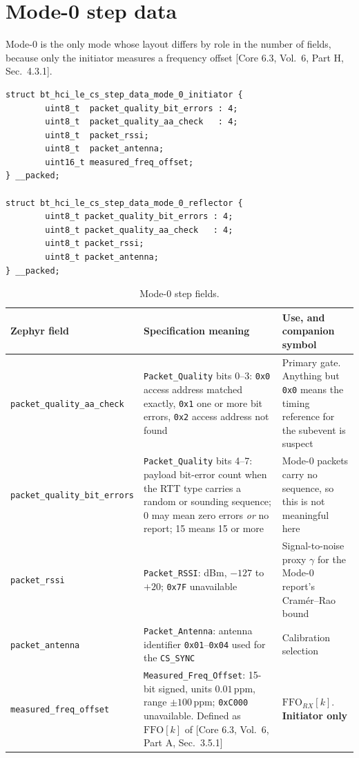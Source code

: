\documentclass[11pt,a4paper]{article}
\newcommand{\code}[1]{\texttt{\small #1}}
\newcommand{\FFO}{\ensuremath{\mathrm{FFO}}}
\newcommand{\core}[1]{\textcolor{rulegrey}{\small[Core 6.3, #1]}}
\begin{document}
\section{Mode-0 step data}
\label{sec:mode0}

Mode-0 is the only mode whose layout differs by role in the number of fields, because only the
initiator measures a frequency offset \core{Vol.\ 6, Part H, Sec.\ 4.3.1}.

\begin{lstlisting}
struct bt_hci_le_cs_step_data_mode_0_initiator {
        uint8_t  packet_quality_bit_errors : 4;
        uint8_t  packet_quality_aa_check   : 4;
        uint8_t  packet_rssi;
        uint8_t  packet_antenna;
        uint16_t measured_freq_offset;
} __packed;

struct bt_hci_le_cs_step_data_mode_0_reflector {
        uint8_t packet_quality_bit_errors : 4;
        uint8_t packet_quality_aa_check   : 4;
        uint8_t packet_rssi;
        uint8_t packet_antenna;
} __packed;
\end{lstlisting}

\begin{table}[h]
\caption{Mode-0 step fields.}
\label{tab:mode0}
\centering\scriptsize
\begin{tabular}{@{}L{32mm}L{56mm}L{50mm}@{}}
\toprule
Zephyr field & Specification meaning & Use, and companion symbol \\
\midrule
\code{packet\_\allowbreak{}quality\_\allowbreak{}aa\_\allowbreak{}check} & \code{Packet\_\allowbreak{}Quality} bits 0--3: \code{0x0} access address matched exactly, \code{0x1} one or more bit errors, \code{0x2} access address not found & Primary gate. Anything but \code{0x0} means the timing reference for the subevent is suspect \\
\code{packet\_\allowbreak{}quality\_\allowbreak{}bit\_\allowbreak{}errors} & \code{Packet\_\allowbreak{}Quality} bits 4--7: payload bit-error count when the RTT type carries a random or sounding sequence; 0 may mean zero errors \emph{or} no report; 15 means 15 or more & Mode-0 packets carry no sequence, so this is not meaningful here \\
\code{packet\_\allowbreak{}rssi} & \code{Packet\_\allowbreak{}RSSI}: dBm, $-127$ to $+20$; \code{0x7F} unavailable & Signal-to-noise proxy $\gamma$ for the Mode-0 report's Cram\'er--Rao bound \\
\code{packet\_\allowbreak{}antenna} & \code{Packet\_\allowbreak{}Antenna}: antenna identifier \code{0x01}--\code{0x04} used for the \code{CS\_\allowbreak{}SYNC} & Calibration selection \\
\code{measured\_\allowbreak{}freq\_\allowbreak{}offset} & \code{Measured\_\allowbreak{}Freq\_\allowbreak{}Offset}: 15-bit signed, units $0.01$\,ppm, range $\pm100$\,ppm; \code{0xC000} unavailable. Defined as $\FFO[k]$ of \core{Vol.\ 6, Part A, Sec.\ 3.5.1} & $\FFO_{RX}[k]$. \textbf{Initiator only} \\
\bottomrule
\end{tabular}
\end{table}
\end{document}
